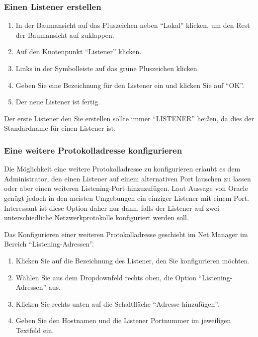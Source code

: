         \subsubsection{Einen Listener erstellen}
          \begin{enumerate}
            \item In der Baumansicht auf das Pluszeichen neben \enquote{Lokal} klicken, um den Rest der Baumansicht auf zuklappen.
            \item Auf den Knotenpunkt \enquote{Listener} klicken.
            \item Links in der Symbolleiste auf das gr\"une Pluszeichen klicken.
\clearpage
            \item Geben Sie eine Bezeichnung f\"ur den Listener ein und klicken Sie auf \enquote{OK}.
            \item Der neue Listener ist fertig.
          \end{enumerate}
          \begin{merke}
            Der erste Listener den Sie erstellen sollte immer \enquote{LISTENER} hei\ss{}en, da dies der Standardname f\"ur einen Listener ist.
          \end{merke}
        \subsubsection{Eine weitere Protokolladresse konfigurieren}
          \label{protocoladdresses}
          Die M\"oglichkeit eine weitere Protokolladresse zu konfigurieren erlaubt es dem Administrator, den einen Listener auf einem alternativen Port lauschen zu lassen oder aber einen weiteren Listening-Port hinzuzuf\"ugen. Laut Aussage von Oracle gen\"ugt jedoch in den meisten Umgebungen ein einziger Listener mit einem Port. Interessant ist diese Option daher nur dann, falls der Listener auf zwei unterschiedliche Netzwerkprotokolle konfiguriert werden soll.

          Das Konfigurieren einer weiteren Protokolladresse geschieht im Net Manager im Bereich \enquote{Listening-Adressen}.
          \begin{enumerate}
            \item Klicken Sie auf die Bezeichnung des Listener, den Sie konfigurieren m\"ochten.
            \item W\"ahlen Sie aus dem Dropdownfeld rechts oben, die Option \enquote{Listening-Adressen} aus.
            \item Klicken Sie rechts unten auf die Schaltfl\"ache \enquote{Adresse hinzuf\"ugen}.
            \item Geben Sie den Hostnamen und die Listener Portnummer im jeweiligen Textfeld ein.
          \end{enumerate}

